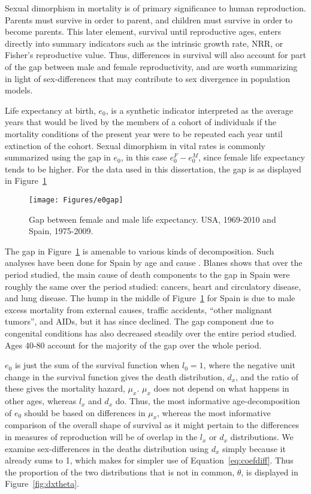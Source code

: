  \FloatBarrier
Sexual dimorphism in mortality is of primary significance to human reproduction.
Parents must survive in order to parent, and children must survive in order to
become parents. This later element, survival until reproductive ages, enters
directly into summary indicators such as the intrinsic growth rate, NRR, or
Fisher's reproductive value. Thus, differences in survival will also account for
part of the gap between male and female reproductivity, and are worth summarizing 
in light of sex-differences
that may contribute to sex divergence in population models.

Life expectancy at birth, $e_0$, is a synthetic indicator interpreted as the
average years that would be lived by the members of a cohort of individuals if
the mortality conditions of the present year were to be repeated each year until extinction of
the cohort. Sexual dimorphism in vital rates is commonly summarized using the
gap in $e_0$, in this case $e_0^F - e_0^M$, since female life expectancy tends
to be higher. For the data used in this dissertation, the gap is as displayed in
Figure~\ref{fig:e0gap}

\begin{figure}[!ht]
  \centering
    \caption{Gap between female and male life expectancy. USA,
    1969-2010 and Spain, 1975-2009.}
     \texttt{[image: Figures/e0gap]}
     \label{fig:e0gap}
\end{figure}

The gap in Figure~\ref{fig:e0gap} is amenable to various kinds of decomposition.
Such analyses have been done for Spain by age and cause \citep[pp 217-218 and
447]{amand2007thesis}. Blanes shows that over the period studied, the main cause of death components to the
gap in Spain were roughly the same over the period studied: cancers, heart
and circulatory disease, and lung disease. The hump in the middle of
Figure~\ref{fig:e0gap} for Spain is due to male excess mortality from external
causes, traffic accidents, ``other malignant tumors'', and AIDs, but it has
since declined. The gap component due to congenital conditions has also
decreased steadily over the entire period studied. Ages 40-80 account for the
majority of the gap over the whole period.


$e_0$ is just the sum of the survival function when $l_0 = 1$, where the
negative unit change in the survival function gives the death distribution,
$d_x$, and the ratio of these gives the mortality hazard, $\mu _x$. $\mu_x$ does
not depend on what happens in other ages, whereas $l_x$ and $d_x$ do. Thus, the
most informative age-decomposition of $e_0$ should be based on differences in
$\mu _x$, whereas the most informative comparison of the overall shape of
survival as it might pertain to the differences in measures of reproduction
will be of overlap in the $l_x$ or $d_x$ distributions. We examine
sex-differences in the deaths distribution using $d_x$ simply
because it already sums to 1, which makes for simpler use of
Equation~\eqref{eq:coefdiff}. Thus the proportion of the two distributions that
is not in common, $\theta$, is displayed in Figure~\ref{fig:dxtheta}.

